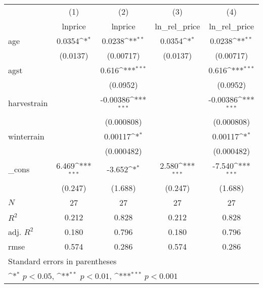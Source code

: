 {
\def\sym#1{\ifmmode^{#1}\else\(^{#1}\)\fi}
\begin{tabular}{l*{4}{c}}
\hline\hline
            &\multicolumn{1}{c}{(1)}&\multicolumn{1}{c}{(2)}&\multicolumn{1}{c}{(3)}&\multicolumn{1}{c}{(4)}\\
            &\multicolumn{1}{c}{lnprice}&\multicolumn{1}{c}{lnprice}&\multicolumn{1}{c}{ln\_rel\_price}&\multicolumn{1}{c}{ln\_rel\_price}\\
\hline
age         &      0.0354\sym{*}  &      0.0238\sym{**} &      0.0354\sym{*}  &      0.0238\sym{**} \\
            &    (0.0137)         &   (0.00717)         &    (0.0137)         &   (0.00717)         \\
[1em]
agst        &                     &       0.616\sym{***}&                     &       0.616\sym{***}\\
            &                     &    (0.0952)         &                     &    (0.0952)         \\
[1em]
harvestrain &                     &    -0.00386\sym{***}&                     &    -0.00386\sym{***}\\
            &                     &  (0.000808)         &                     &  (0.000808)         \\
[1em]
winterrain  &                     &     0.00117\sym{*}  &                     &     0.00117\sym{*}  \\
            &                     &  (0.000482)         &                     &  (0.000482)         \\
[1em]
\_cons      &       6.469\sym{***}&      -3.652\sym{*}  &       2.580\sym{***}&      -7.540\sym{***}\\
            &     (0.247)         &     (1.688)         &     (0.247)         &     (1.688)         \\
\hline
\(N\)       &          27         &          27         &          27         &          27         \\
\(R^{2}\)   &       0.212         &       0.828         &       0.212         &       0.828         \\
adj. \(R^{2}\)&       0.180         &       0.796         &       0.180         &       0.796         \\
rmse        &       0.574         &       0.286         &       0.574         &       0.286         \\
\hline\hline
\multicolumn{5}{l}{\footnotesize Standard errors in parentheses}\\
\multicolumn{5}{l}{\footnotesize \sym{*} \(p<0.05\), \sym{**} \(p<0.01\), \sym{***} \(p<0.001\)}\\
\end{tabular}
}
